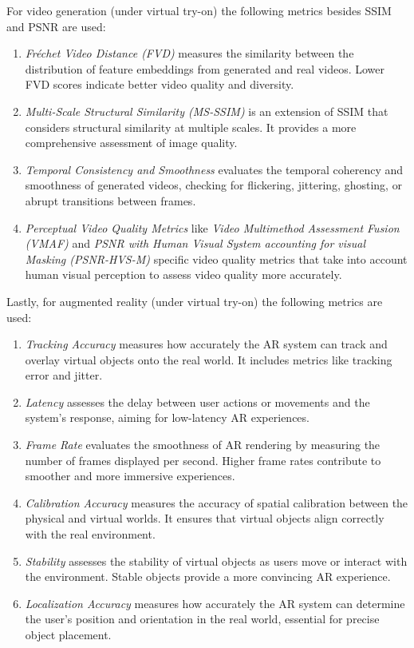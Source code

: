 		For video generation (under virtual try-on) the following metrics besides SSIM and PSNR are used:

		\begin{enumerate}
			\item \textit{Fréchet Video Distance (FVD)} measures the similarity between the distribution of feature embeddings from generated and real videos. Lower FVD scores indicate better video quality and diversity.
			\item \textit{Multi-Scale Structural Similarity (MS-SSIM)} is an extension of SSIM that considers structural similarity at multiple scales. It provides a more comprehensive assessment of image quality.
			\item \textit{Temporal Consistency and Smoothness} evaluates the temporal coherency and smoothness of generated videos, checking for flickering, jittering, ghosting, or abrupt transitions between frames.
			\item \textit{Perceptual Video Quality Metrics} like \textit{Video Multimethod Assessment Fusion (VMAF)} and \textit{PSNR with Human Visual System accounting for visual Masking (PSNR-HVS-M)} specific video quality metrics that take into account human visual perception to assess video quality more accurately.
		\end{enumerate}

		Lastly, for augmented reality (under virtual try-on) the following metrics are used:

		\begin{enumerate}
			\item \textit{Tracking Accuracy} measures how accurately the AR system can track and overlay virtual objects onto the real world. It includes metrics like tracking error and jitter.
			\item \textit{Latency} assesses the delay between user actions or movements and the system's response, aiming for low-latency AR experiences.
			\item \textit{Frame Rate} evaluates the smoothness of AR rendering by measuring the number of frames displayed per second. Higher frame rates contribute to smoother and more immersive experiences.
			\item \textit{Calibration Accuracy} measures the accuracy of spatial calibration between the physical and virtual worlds. It ensures that virtual objects align correctly with the real environment.
			\item \textit{Stability} assesses the stability of virtual objects as users move or interact with the environment. Stable objects provide a more convincing AR experience.
			\item \textit{Localization Accuracy} measures how accurately the AR system can determine the user's position and orientation in the real world, essential for precise object placement.
		\end{enumerate}